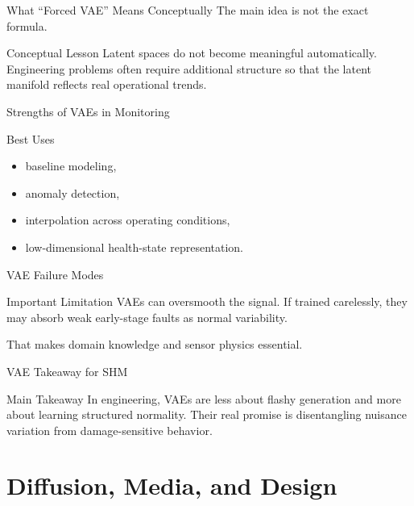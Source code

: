 \documentclass[12pt]{beamer}
\begin{document}
\begin{frame}{What ``Forced VAE'' Means Conceptually}
  The main idea is not the exact formula.

  \begin{conceptbox}{Conceptual Lesson}
    Latent spaces do not become meaningful automatically. Engineering problems often require additional structure so that the latent manifold reflects real operational trends.
  \end{conceptbox}
\end{frame}

\begin{frame}{Strengths of VAEs in Monitoring}
  \begin{examplebox}{Best Uses}
    \begin{itemize}
      \item baseline modeling,
      \item anomaly detection,
      \item interpolation across operating conditions,
      \item low-dimensional health-state representation.
    \end{itemize}
  \end{examplebox}
\end{frame}

\begin{frame}{VAE Failure Modes}
  \begin{warningbox}{Important Limitation}
    VAEs can oversmooth the signal. If trained carelessly, they may absorb weak early-stage faults as normal variability.
  \end{warningbox}

  That makes domain knowledge and sensor physics essential.
\end{frame}

\begin{frame}{VAE Takeaway for SHM}
  \begin{conceptbox}{Main Takeaway}
    In engineering, VAEs are less about flashy generation and more about learning structured normality. Their real promise is disentangling nuisance variation from damage-sensitive behavior.
  \end{conceptbox}
\end{frame}

\section{Diffusion, Media, and Design}
\end{document}
